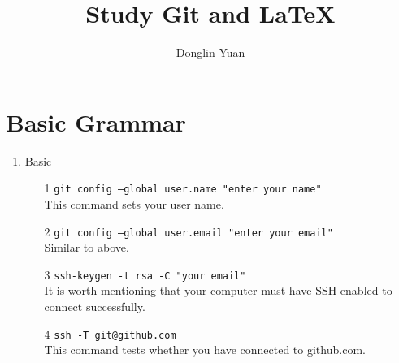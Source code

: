 \documentclass{article}
\begin{document}
  
\title{Study Git and LaTeX}  
\author{Donglin Yuan}  
\maketitle  
\section{Basic Grammar}  
\begin{enumerate}  
    \item Basic  
    \begin{itemize}  
        \item[1] \texttt{git config --global user.name "enter your name"} \\
        This command sets your user name.  
        \item[2] \texttt{git config --global user.email "enter your email"} \\
        Similar to above.  
        \item[3] \texttt{ssh-keygen -t rsa -C "your email"} \\
        It is worth mentioning that your computer must have SSH enabled to connect successfully.  
        \item[4] \texttt{ssh -T git@github.com} \\
        This command tests whether you have connected to github.com.  
    \end{itemize}  
    

\end{enumerate}
\end{document}
